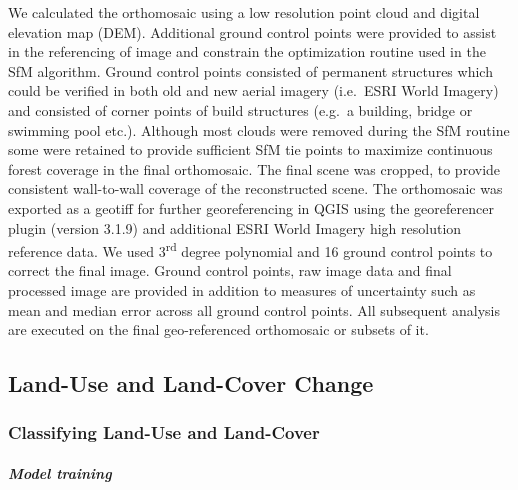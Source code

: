 \documentclass[remote sensing,article,submit,moreauthors,pdftex]{mdpi}
\begin{document}
We calculated the orthomosaic using a low resolution point cloud and
digital elevation map (DEM). Additional ground control points were
provided to assist in the referencing of image and constrain the
optimization routine used in the SfM algorithm. Ground control points
consisted of permanent structures which could be verified in both old
and new aerial imagery (i.e.~ESRI World Imagery) and consisted of corner
points of build structures (e.g.~a building, bridge or swimming pool
etc.). Although most clouds were removed during the SfM routine some
were retained to provide sufficient SfM tie points to maximize
continuous forest coverage in the final orthomosaic. The final scene was
cropped, to provide consistent wall-to-wall coverage of the
reconstructed scene. The orthomosaic was exported as a geotiff for
further georeferencing in QGIS \citep{qgisdevelopmentteam2018} using the
georeferencer plugin (version 3.1.9) and additional ESRI World Imagery
high resolution reference data. We used 3\textsuperscript{rd} degree
polynomial and 16 ground control points to correct the final image.
Ground control points, raw image data and final processed image are
provided in addition to measures of uncertainty such as mean and median
error across all ground control points. All subsequent analysis are
executed on the final geo-referenced orthomosaic or subsets of it.

\hypertarget{land-use-and-land-cover-change}{%
\subsection{Land-Use and Land-Cover
Change}\label{land-use-and-land-cover-change}}

\hypertarget{classifying-land-use-and-land-cover}{%
\subsubsection{Classifying Land-Use and
Land-Cover}\label{classifying-land-use-and-land-cover}}

\hypertarget{model-training}{%
\paragraph{\texorpdfstring{\emph{Model
training}}{Model training}}\label{model-training}}
\end{document}
